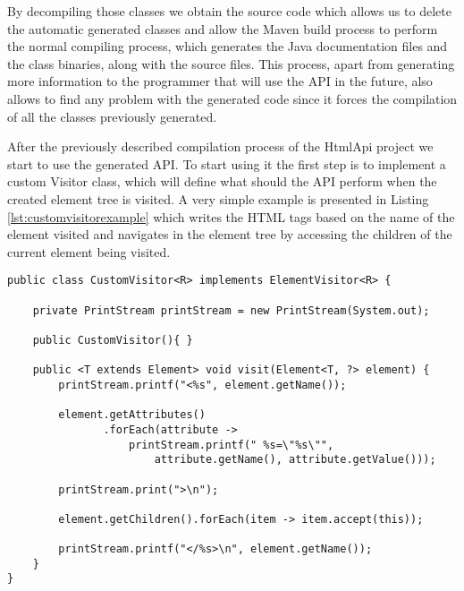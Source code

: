\noindent
By decompiling those classes we obtain the source code which allows us to delete the automatic generated classes and allow the Maven build process to perform the normal compiling process, which generates the Java documentation files and the class binaries, along with the source files. This process, apart from generating more information to the programmer that will use the \ac{API} in the future, also allows to find any problem with the generated code since it forces the compilation of all the classes previously generated.

\noindent
After the previously described compilation process of the HtmlApi project we start to use the generated \ac{API}. To start using it the first step is to implement a custom Visitor class, which will define what should the \ac{API} perform when the created element tree is visited. A very simple example is presented in Listing \ref{lst:customvisitorexample} which writes the \ac{HTML} tags based on the name of the element visited and navigates in the element tree by accessing the children of the current element being visited.

\bigskip


\begin{minipage}{\linewidth}
\begin{lstlisting}[caption={Custom Visitor},captionpos=b,label={lst:customvisitorexample}]
public class CustomVisitor<R> implements ElementVisitor<R> {

    private PrintStream printStream = new PrintStream(System.out);

    public CustomVisitor(){ }

    public <T extends Element> void visit(Element<T, ?> element) {
        printStream.printf("<%s", element.getName());

        element.getAttributes()
               .forEach(attribute -> 
                   printStream.printf(" %s=\"%s\"", 
                       attribute.getName(), attribute.getValue()));

        printStream.print(">\n");

        element.getChildren().forEach(item -> item.accept(this));

        printStream.printf("</%s>\n", element.getName());
    }
}
\end{lstlisting}
\end{minipage}

